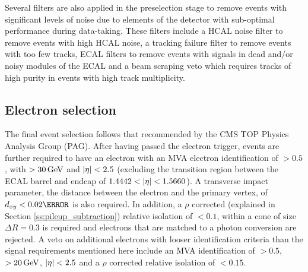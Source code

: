 

Several filters are also applied in the preselection stage to remove events with significant levels of noise
due to elements of the detector with sub-optimal performance during data-taking. These filters include a HCAL
noise filter to remove events with high HCAL noise, a tracking failure filter to remove events with too few
tracks, ECAL filters to remove events with signals in dead and/or noisy modules of the ECAL and a beam
scraping veto which requires tracks of high purity in events with high track multiplicity.


\subsection{Electron selection}
\label{electronplusjetschannelselection}
The final event selection follows that recommended by the CMS TOP Physics Analysis Group (PAG). After having
passed the electron trigger, events are further required to have an electron with an MVA electron
identification of $>0.5$, with \Et $> 30\,\text{Ge\hspace{-.08em}V}$ and $|\eta| < 2.5$ (excluding the transition region between
the ECAL barrel and endcap of $1.4442 < |\eta| < 1.5660$). A transverse impact parameter, the distance
between the electron and the primary vertex, of $d_{xy} < 0.02\cm$ is also required. In addition, a $\rho$
corrected (explained in Section \ref{ss:pileup_subtraction}) relative isolation of $< 0.1$, within a cone of size
$\Delta R = 0.3$ is required and electrons that are matched to a photon conversion are rejected. 
A veto on additional electrons with looser identification criteria than the signal requirements mentioned here
include an MVA identification of $> 0.5$, \Et $> 20\,\text{Ge\hspace{-.08em}V}$, $|\eta| < 2.5$ and a $\rho$ corrected relative
isolation of $<0.15$.

